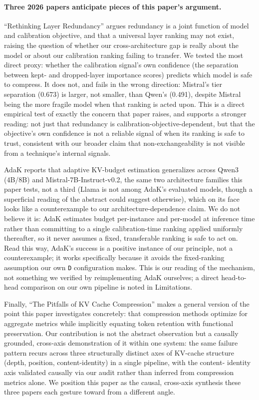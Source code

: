 \documentclass[11pt]{article}
\begin{document}
\paragraph{Three 2026 papers anticipate pieces of this paper's argument.}
``Rethinking Layer Redundancy'' \citep{rethinkredundancy2026} argues
redundancy is a joint function of model and calibration objective, and
that a universal layer ranking may not exist, raising the question of
whether our cross-architecture gap is really about the model or about our
calibration ranking failing to transfer. We tested the most direct proxy:
whether the calibration signal's own confidence (the separation between
kept- and dropped-layer importance scores) predicts which model is safe
to compress. It does not, and fails in the wrong direction: Mistral's
tier separation (0.673) is larger, not smaller, than Qwen's (0.491),
despite Mistral being the more fragile model when that ranking is acted
upon. This is a direct empirical test of exactly the concern that paper
raises, and supports a stronger reading: not just that redundancy is
calibration-objective-dependent, but that the objective's own confidence
is not a reliable signal of when its ranking is safe to trust, consistent
with our broader claim that non-exchangeability is not visible from a
technique's internal signals.

AdaK \citep{adak2026} reports that adaptive KV-budget estimation
generalizes across Qwen3 (4B/8B) and Mistral-7B-Instruct-v0.2, the same
two architecture families this paper tests, not a third (Llama is not
among AdaK's evaluated models, though a superficial reading of the
abstract could suggest otherwise), which on its face looks like a
counterexample to our architecture-dependence claim. We do not believe it
is: AdaK estimates budget per-instance and per-model at inference time
rather than committing to a single calibration-time ranking applied
uniformly thereafter, so it never assumes a fixed, transferable ranking
is safe to act on. Read this way, AdaK's success is a positive instance
of our principle, not a counterexample; it works specifically because it
avoids the fixed-ranking assumption our own \texttt{D} configuration
makes. This is our reading of the mechanism, not something we verified
by reimplementing AdaK ourselves; a direct head-to-head comparison on our
own pipeline is noted in Limitations.

Finally, ``The Pitfalls of KV Cache Compression'' \citep{pitfallskv2026}
makes a general version of the point this paper investigates concretely:
that compression methods optimize for aggregate metrics while implicitly
equating token retention with functional preservation. Our contribution
is not the abstract observation but a causally grounded, cross-axis
demonstration of it within one system: the same failure pattern recurs
across three structurally distinct axes of KV-cache structure (depth,
position, content-identity) in a single pipeline, with the content-
identity axis validated causally via our audit rather than inferred from
compression metrics alone. We position this paper as the causal,
cross-axis synthesis these three papers each gesture toward from a
different angle.
\end{document}
